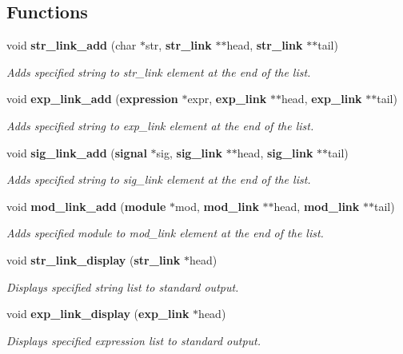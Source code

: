 \subsection*{Functions}
\begin{CompactItemize}
\item 
void {\bf str\_\-link\_\-add} (char $\ast$str, {\bf str\_\-link} $\ast$$\ast$head, {\bf str\_\-link} $\ast$$\ast$tail)
\begin{CompactList}\small\item\em Adds specified string to str\_\-link element at the end of the list.\item\end{CompactList}\item 
void {\bf exp\_\-link\_\-add} ({\bf expression} $\ast$expr, {\bf exp\_\-link} $\ast$$\ast$head, {\bf exp\_\-link} $\ast$$\ast$tail)
\begin{CompactList}\small\item\em Adds specified string to exp\_\-link element at the end of the list.\item\end{CompactList}\item 
void {\bf sig\_\-link\_\-add} ({\bf signal} $\ast$sig, {\bf sig\_\-link} $\ast$$\ast$head, {\bf sig\_\-link} $\ast$$\ast$tail)
\begin{CompactList}\small\item\em Adds specified string to sig\_\-link element at the end of the list.\item\end{CompactList}\item 
void {\bf mod\_\-link\_\-add} ({\bf module} $\ast$mod, {\bf mod\_\-link} $\ast$$\ast$head, {\bf mod\_\-link} $\ast$$\ast$tail)
\begin{CompactList}\small\item\em Adds specified module to mod\_\-link element at the end of the list.\item\end{CompactList}\item 
void {\bf str\_\-link\_\-display} ({\bf str\_\-link} $\ast$head)
\begin{CompactList}\small\item\em Displays specified string list to standard output.\item\end{CompactList}\item 
void {\bf exp\_\-link\_\-display} ({\bf exp\_\-link} $\ast$head)
\begin{CompactList}\small\item\em Displays specified expression list to standard output.\item\end{CompactList}\item 

\end{CompactItemize}
